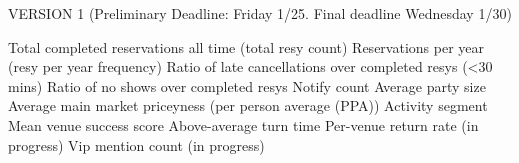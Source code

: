 VERSION 1 (Preliminary Deadline: Friday 1/25. Final deadline Wednesday 1/30)   

\sigma

Total completed reservations all time (total resy count)  
Reservations per year (resy per year frequency)  
Ratio of late cancellations over completed resys (<30 mins)  
Ratio of no shows over completed resys  
Notify count  
Average party size  
Average main market priceyness (per person average (PPA))  
Activity segment  
Mean venue success score  
Above-average turn time  
Per-venue return rate (in progress)    
Vip mention count (in progress)  
